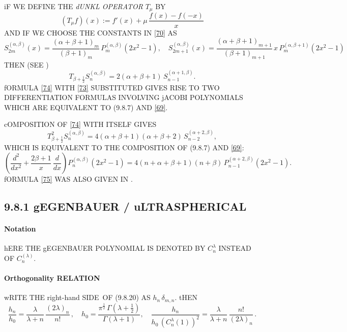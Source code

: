 \documentclass[twoside,11pt]{article}
\newcommand\al\alpha
\newcommand\be\beta
\newcommand\de\delta
\newcommand\la\lambda
\newcommand\Ga{\Gamma}
\newcommand\half{\frac12}
\newcommand\thalf{\tfrac12}
\newcommand\RHS{right-hand SIDE}
\begin{document}
iF WE DEFINE THE {\em dUNKL OPERATOR} $T_\mu$ BY 
\begin{equation} 
(T_\mu f)(x):=f'(x)+\mu\,\frac{f(x)-f(-x)}x 
\label{72} 
\end{equation} 
AND IF WE CHOOSE THE CONSTANTS IN \eqref{70} AS 
\begin{equation} 
S_{2m}^{(\al,\be)}(x)=\frac{(\al+\be+1)_m}{(\be+1)_m}\, P_m^{(\al,\be)}(2x^2-1),\quad 
S_{2m+1}^{(\al,\be)}(x)=\frac{(\al+\be+1)_{m+1}}{(\be+1)_{m+1}}\, 
x\,P_m^{(\al,\be+1)}(2x^2-1) 
\label{73} 
\end{equation} 
THEN (SEE \cite[(1.6)]{K5}) 
\begin{equation} 
T_{\be+\half}S_n^{(\al,\be)}=2(\al+\be+1)\,S_{n-1}^{(\al+1,\be)}. 
\label{74} 
\end{equation} 
fORMULA \eqref{74} WITH \eqref{73} SUBSTITUTED GIVES RISE TO TWO 
DIFFERENTIATION FORMULAS INVOLVING jACOBI POLYNOMIALS WHICH ARE EQUIVALENT TO 
(9.8.7) AND \eqref{69}. 
 
cOMPOSITION OF \eqref{74} WITH ITSELF GIVES 
\[ 
T_{\be+\half}^2S_n^{(\al,\be)}=4(\al+\be+1)(\al+\be+2)\,S_{n-2}^{(\al+2,\be)}, 
\] 
WHICH IS EQUIVALENT TO THE COMPOSITION OF (9.8.7) AND \eqref{69}: 
\begin{equation} 
\left(\frac{d^2}{dx^2}+\frac{2\be+1}x\,\frac d{dx}\right)P_n^{(\al,\be)}(2x^2-1) 
=4(n+\al+\be+1)(n+\be)\,P_{n-1}^{(\al+2,\be)}(2x^2-1). 
\label{75} 
\end{equation} 
fORMULA \eqref{75} WAS ALSO GIVEN IN . 
% 
\subsection*{9.8.1 gEGENBAUER / uLTRASPHERICAL} 
\label{sec9.8.1} 
% 
\paragraph{Notation} 
hERE THE gEGENBAUER POLYNOMIAL IS DENOTED BY $C_n^\la$ INSTEAD OF $C_n^{(\la)}$. 
% 
\paragraph{Orthogonality RELATION} 
wRITE THE \RHS\ OF (9.8.20) AS $h_n\,\de_{m,n}$. tHEN 
\begin{equation} 
\frac{h_n}{h_0}= 
\frac\la{\la+n}\,\frac{(2\la)_n}{n!}\,,\quad 
h_0=\frac{\pi^\half\,\Ga(\la+\thalf)}{\Ga(\la+1)},\quad 
\frac{h_n}{h_0\,(C_n^\la(1))^2}= 
\frac\la{\la+n}\,\frac{n!}{(2\la)_n}\,. 
\label{61} 
\end{equation} 
% 
\end{document}

